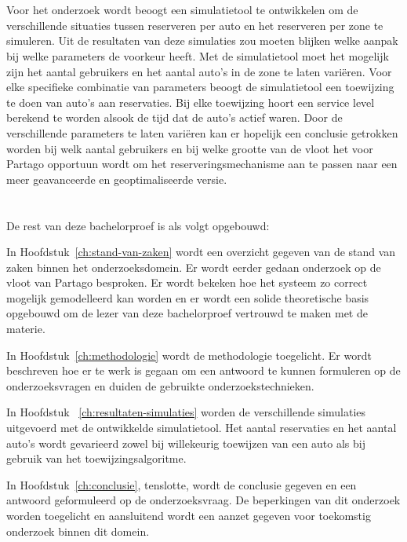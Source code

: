 \section{}
\label{sec:onderzoeksdoelstelling}

Voor het onderzoek wordt beoogt een simulatietool te ontwikkelen om de verschillende situaties tussen reserveren per auto en het reserveren per zone te simuleren. Uit de resultaten van deze simulaties zou moeten blijken welke aanpak bij welke parameters de voorkeur heeft. Met de simulatietool moet het mogelijk zijn het aantal gebruikers en het aantal auto's in de zone te laten variëren. Voor elke specifieke combinatie van parameters beoogt de simulatietool een toewijzing te doen van auto's aan reservaties. Bij elke toewijzing hoort een service level berekend te worden alsook de tijd dat de auto's actief waren. Door de verschillende parameters te laten variëren kan er hopelijk een conclusie getrokken worden bij welk aantal gebruikers en bij welke grootte van de vloot het voor Partago opportuun wordt om het reserveringsmechanisme aan te passen naar een meer geavanceerde en geoptimaliseerde versie.

\section{}
\label{sec:opzet-bachelorproef}


De rest van deze bachelorproef is als volgt opgebouwd:

In Hoofdstuk~\ref{ch:stand-van-zaken} wordt een overzicht gegeven van de stand van zaken binnen het onderzoeksdomein. Er wordt eerder gedaan onderzoek op de vloot van Partago besproken. Er wordt bekeken hoe het systeem zo correct mogelijk gemodelleerd kan worden en er wordt een solide theoretische basis opgebouwd om de lezer van deze bachelorproef vertrouwd te maken met de materie.

In Hoofdstuk~\ref{ch:methodologie} wordt de methodologie toegelicht. Er wordt beschreven hoe er te werk is gegaan om een antwoord te kunnen formuleren op de onderzoeksvragen en duiden de gebruikte onderzoekstechnieken.

In Hoofdstuk ~\ref{ch:resultaten-simulaties} worden de verschillende simulaties uitgevoerd met de ontwikkelde simulatietool. Het aantal reservaties en het aantal auto's wordt gevarieerd zowel bij willekeurig toewijzen van een auto als bij gebruik van het toewijzingsalgoritme.

In Hoofdstuk~\ref{ch:conclusie}, tenslotte, wordt de conclusie gegeven en een antwoord geformuleerd op de onderzoeksvraag. De beperkingen van dit onderzoek worden toegelicht en aansluitend wordt een aanzet gegeven voor toekomstig onderzoek binnen dit domein.
